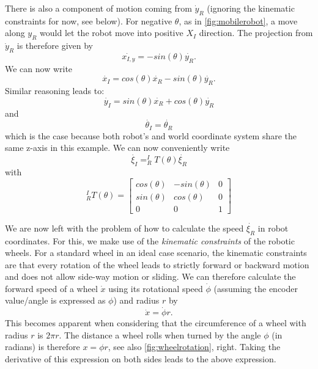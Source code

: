 There is also a component of motion coming from $ \dot{y}_R$ (ignoring the kinematic constraints for now, see below).  For negative $ \theta$, as in \cref{fig:mobilerobot}, a move along $y_R$ would let the robot move into positive $ X_I$ direction. The projection from $ \dot{y}_R$ is therefore given by
\begin{equation}
\dot{x_{I,y}}=-sin(\theta)\dot{y_R}.
\end{equation}
We can now write
\begin{equation}
\dot{x_I}=cos(\theta) \dot{x_R} - sin(\theta) \dot{y_R}.
\end{equation}
Similar reasoning leads to:
\begin{equation}
\dot{y_I}=sin(\theta) \dot{x_R} + cos(\theta) \dot{y_R}
\end{equation}
and
\begin{equation}
\dot{\theta_I}=\dot{\theta_R}
\end{equation}
which is the case because both robot's and world coordinate system share the same z-axis in this example. We can now conveniently write
\begin{equation}
\dot{\xi_I}=^I_RT(\theta)\dot{\xi_R}
\end{equation}
with
\begin{equation}
^I_RT(\theta)=\left[\begin{array}{ccc}
cos(\theta) & -sin(\theta) & 0 \\
sin(\theta) & cos(\theta) & 0 \\
0 & 0 & 1\end{array}\right]
\end{equation}

We are now left with the problem of how to calculate the speed $ \dot{\xi_R}$ in robot coordinates. For this, we make use of the \emph{kinematic constraints} of the robotic wheels.
For a standard wheel in an ideal case scenario, the kinematic constraints are that every rotation of the wheel leads to strictly forward or backward motion and does not allow side-way motion or sliding. We can therefore calculate the forward speed of a wheel $ \dot{x}$ using its rotational speed $ \dot{\phi}$ (assuming the encoder value/angle is expressed as $ \phi$) and radius $ r$ by
\begin{equation}
\dot{x}=\dot{\phi}r.
\end{equation}
This becomes apparent when considering that the circumference of a wheel with radius $r$ is $2\pi r$. The distance a wheel rolls when turned by the angle $ \phi$ (in radians) is therefore $ x=\phi r$, see also \cref{fig:wheelrotation}, right. Taking the derivative of this expression on both sides leads to the above expression.

